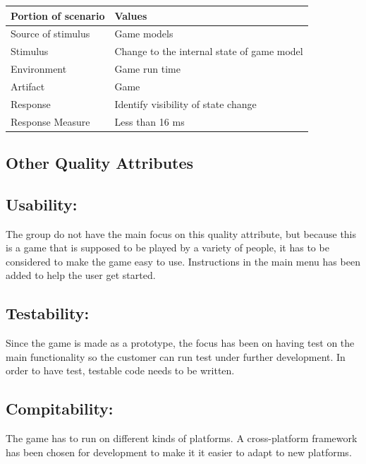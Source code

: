 \begin{tabular}{| l | l |}
	\hline
	\rowcolor{gray}
	{\bf Portion of scenario} & {\bf Values} \\ \hline
	Source of stimulus & Game models\\ \hline
	Stimulus & Change to the internal state of game model\\ \hline
	Environment & Game run time \\ \hline
	Artifact &  Game \\ \hline
	Response & Identify visibility of state change\\ \hline
	Response Measure & Less than 16 ms\\ \hline
\end{tabular}

\subsection{Other Quality Attributes}
\subsection*{Usability: } The group do not have the main focus on this quality attribute, but because this is a game that is supposed to be played by a variety of people, it has to be considered to make the game easy to use. Instructions in the main menu has been added to help the user get started.\cite{attributes}

\subsection*{Testability: } Since the game is made as a prototype, the focus has been on having
test on the main functionality so the customer can run test under further development.
In order to have test, testable code needs to be written.\cite{attributes}

\subsection*{Compitability: } The game has to run on different kinds of platforms. A cross-platform framework has been chosen for development to make it it easier to adapt to new platforms.
